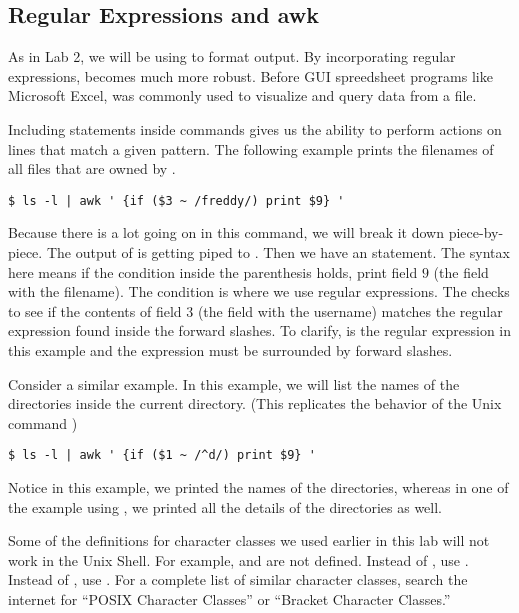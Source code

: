 \subsection*{Regular Expressions and awk}
As in Lab 2, we will be using  to format output. By incorporating regular expressions,  becomes much more robust. Before GUI spreedsheet programs like Microsoft Excel,  was commonly used to visualize and query data from a file.  

Including  statements inside  commands gives us the ability to perform actions on lines that match a given pattern. The following example prints the filenames of all files that are owned by .
\begin{lstlisting}
$ ls -l | awk ' {if ($3 ~ /freddy/) print $9} '
\end{lstlisting}

Because there is a lot going on in this command, we will break it down piece-by-piece. The output of  is getting piped to . Then we have an  statement. The syntax here means if the condition inside the parenthesis holds, print field $9$ (the field with the filename). The condition is where we use regular expressions. The \li{\~} checks to see if the contents of field $3$ (the field with the username) matches the regular expression found inside the forward slashes. To clarify,  is the regular expression in this example and the expression must be surrounded by forward slashes.  

Consider a similar example. In this example, we will list the names of the directories inside the current directory. (This replicates the behavior of the Unix command )

\begin{lstlisting}
$ ls -l | awk ' {if ($1 ~ /^d/) print $9} '
\end{lstlisting}

Notice in this example, we printed the names of the directories, whereas in one of the example using , we printed all the details of the directories as well. 

\begin{warn}
Some of the definitions for character classes we used earlier in this lab will not work in the Unix Shell. For example, \li{\\w} and \li{\\d} are not defined. Instead of \li{\\w}, use \li{[[:alnum:]]}. Instead of \li{\\d}, use \li{[[:digit:]]}. For a complete list of similar character classes, search the internet for ``POSIX Character Classes'' or ``Bracket Character Classes.''
\end{warn}

